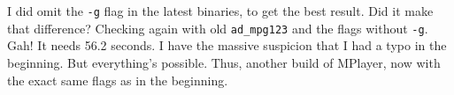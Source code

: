 \documentclass[a4paper,12pt]{scrartcl}
\begin{document}
I did omit the \verb:-g: flag in the latest binaries, to get the best result. Did it make that difference? Checking again with old \verb:ad_mpg123: and the flags without \verb:-g:. Gah! It needs 56.2 seconds.
I have the massive suspicion that I had a typo in the beginning.
But everything's possible. Thus, another build of MPlayer, now with the exact same flags as in the beginning.
\end{document}
